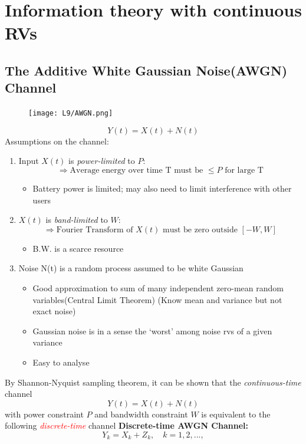 \documentclass[12pt]{article}
\begin{document}
\section{Information theory with continuous RVs}
\subsection{The Additive White Gaussian Noise(AWGN) Channel}
\begin{figure}[H]
    \centering
    \texttt{[image: L9/AWGN.png]}
\end{figure}
\[
Y(t) = X(t) + N(t)
\]
Assumptions on the channel:
\begin{enumerate}
    \item Input $X(t)$ is \textcolor{blue1}{\textit{power-limited}} to $P$:
    \[
    \Rightarrow \textrm{Average energy over time T must be }\le P \textrm{ for large T}
    \]
    \begin{itemize}
        \item Battery power is limited; may also need to limit interference with other users
    \end{itemize}
    \item $X(t)$ is \textcolor{blue1}{\textit{band-limited}} to $W$:
    \[
    \Rightarrow \textrm{Fourier Transform of }X(t)\textrm{ must be zero outside }[-W,W]
    \]
    \begin{itemize}
        \item B.W. is a scarce resource
    \end{itemize}
    \item Noise N(t) is a random process assumed to be white Gaussian 
    \begin{itemize}
        \item Good approximation to sum of many independent zero-mean random variables(Central Limit Theorem) (Know mean and variance but not exact noise)
        \item Gaussian noise is in a sense the `worst' among noise rvs of a given variance 
        \item Easy to analyse
    \end{itemize}
\end{enumerate}
By Shannon-Nyquist sampling theorem, it can be shown that the \textcolor{blue1}{\textit{continuous-time}} channel
\[
Y(t) = X(t) + N(t)
\]
with power constraint $P$ and bandwidth constraint $W$ is equivalent to the following \textcolor{red}{\textit{discrete-time}} channel
{\textcolor{blue1}{\textbf{Discrete-time AWGN Channel:}}}
\[
Y_k = X_k + Z_k, \quad k=1,2,...,
\]
\end{document}
